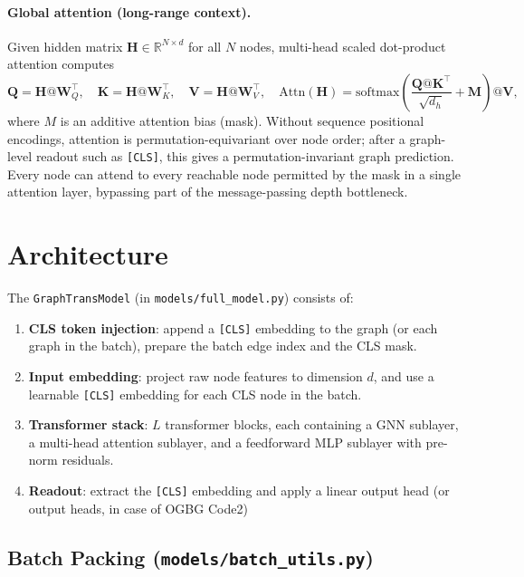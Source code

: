 \documentclass[11pt]{article}
\begin{document}
\paragraph{Global attention (long-range context).}
Given hidden matrix $\mathbf{H}\in\mathbb{R}^{N\times d}$ for all $N$ nodes, multi-head scaled dot-product attention computes
\[
\mathbf{Q}=\mathbf{H} @ \mathbf{W}_Q^\top,\quad
\mathbf{K}=\mathbf{H} @ \mathbf{W}_K^\top,\quad
\mathbf{V}=\mathbf{H} @ \mathbf{W}_V^\top,\quad
\mathrm{Attn}(\mathbf{H})=\mathrm{softmax}\!\left(\frac{\mathbf{Q} @ \mathbf{K}^\top}{\sqrt{d_h}}+ \mathbf{M}\right) @ \mathbf{V},
\]
where $M$ is an additive attention bias (mask). Without sequence positional encodings, attention is permutation-equivariant over node order; after a graph-level readout such as \texttt{[CLS]}, this gives a permutation-invariant graph prediction. Every node can attend to every reachable node permitted by the mask in a single attention layer, bypassing part of the message-passing depth bottleneck.

\section{Architecture}

The \texttt{GraphTransModel} (in \texttt{models/full\_model.py}) consists of:

\begin{enumerate}[leftmargin=1.5em]
  \item \textbf{CLS token injection}: append a \texttt{[CLS]} embedding to the graph (or each graph in the batch), prepare the batch edge index and the CLS mask.
  \item \textbf{Input embedding}: project raw node features to dimension $d$, and use a learnable \texttt{[CLS]} embedding for each CLS node in the batch.
  \item \textbf{Transformer stack}: $L$ transformer blocks, each containing a GNN sublayer, a multi-head attention sublayer, and a feedforward MLP sublayer with pre-norm residuals.
  \item \textbf{Readout}: extract the \texttt{[CLS]} embedding and apply a linear output head (or output heads, in case of \textsf{OGBG Code2})
\end{enumerate}

\subsection{Batch Packing (\texttt{models/batch\_utils.py})}
\end{document}
